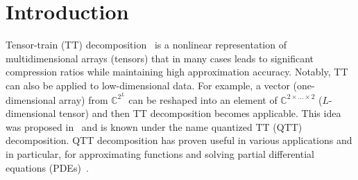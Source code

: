 \documentclass[a4paper]{article}
\newcommand{\LL}{L}
\begin{document}
\section{Introduction}	

Tensor-train (TT) decomposition~\cite{osel-tt-2011} is a nonlinear representation of multidimensional arrays (tensors) that in many cases leads to significant compression ratios while maintaining high approximation accuracy.
Notably, TT can also be applied to low-dimensional data. 
For example, a vector (one-dimensional array) from $\mathbb{C}^{2^\LL}$ can be reshaped into an element of $\mathbb{C}^{2 \times \dots \times 2}$ ($\LL$-dimensional tensor) and then TT decomposition becomes applicable.
This idea was proposed in~\cite{osel-2d2d-2010,khor-qtt-2011} and is known under the name quantized TT (QTT) decomposition.
QTT decomposition has proven useful in various applications and in particular, for approximating functions and solving partial differential equations (PDEs)~\cite{khoromskij2018tensor}.
\end{document}
